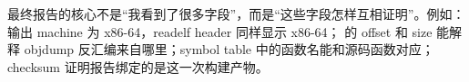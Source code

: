 \begin{labbox}
最终报告的核心不是“我看到了很多字段”，而是“这些字段怎样互相证明”。例如： 输出 machine 为 x86-64，readelf header 同样显示 x86-64； 的 offset 和 size 能解释 objdump 反汇编来自哪里；symbol table 中的函数名能和源码函数对应；checksum 证明报告绑定的是这一次构建产物。
\end{labbox}
